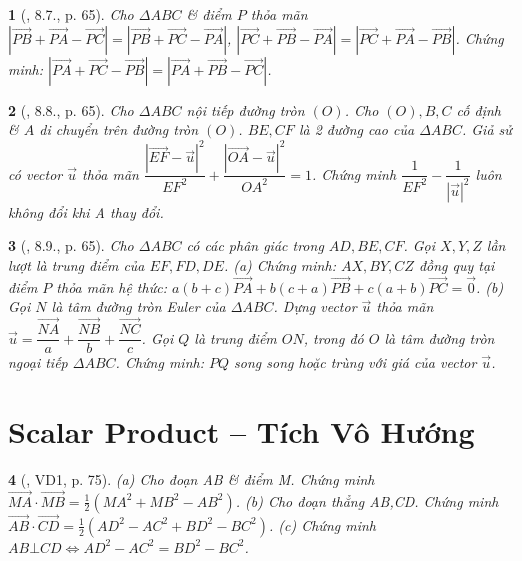\documentclass{article}
\newtheorem{baitoan}{}
\begin{document}
\begin{baitoan}[\cite{Hai_Hung_Thu_Tung2022_tap_1}, 8.7., p. 65]
	Cho $\Delta ABC$ \& điểm $P$ thỏa mãn $|\overrightarrow{PB} + \overrightarrow{PA} - \overrightarrow{PC}| = |\overrightarrow{PB} + \overrightarrow{PC} - \overrightarrow{PA}|$, $|\overrightarrow{PC} + \overrightarrow{PB} - \overrightarrow{PA}| = |\overrightarrow{PC} + \overrightarrow{PA} - \overrightarrow{PB}|$. Chứng minh: $|\overrightarrow{PA} + \overrightarrow{PC} - \overrightarrow{PB}| = |\overrightarrow{PA} + \overrightarrow{PB} - \overrightarrow{PC}|$.
\end{baitoan}

\begin{baitoan}[\cite{Hai_Hung_Thu_Tung2022_tap_1}, 8.8., p. 65]
	Cho $\Delta ABC$ nội tiếp đường tròn $(O)$. Cho $(O),B,C$ cố định \& $A$ di chuyển trên đường tròn $(O)$. $BE,CF$ là 2 đường cao của $\Delta ABC$. Giả sử có vector $\vec{u}$ thỏa mãn $\dfrac{|\overrightarrow{EF} - \vec{u}|^2}{EF^2} + \dfrac{|\overrightarrow{OA} - \vec{u}|^2}{OA^2} = 1$. Chứng minh $\dfrac{1}{EF^2} - \dfrac{1}{|\vec{u}|^2}$ luôn không đổi khi A thay đổi.
\end{baitoan}

\begin{baitoan}[\cite{Hai_Hung_Thu_Tung2022_tap_1}, 8.9., p. 65]
	Cho $\Delta ABC$ có các phân giác trong $AD,BE,CF$. Gọi $X,Y,Z$ lần lượt là trung điểm của $EF,FD,DE$. (a) Chứng minh: $AX,BY,CZ$ đồng quy tại điểm $P$ thỏa mãn hệ thức: $a(b + c)\overrightarrow{PA} + b(c + a)\overrightarrow{PB} + c(a + b)\overrightarrow{PC} = \vec{0}$. (b) Gọi $N$ là tâm đường tròn Euler của $\Delta ABC$. Dựng vector $\vec{u}$ thỏa mãn $\vec{u} = \dfrac{\overrightarrow{NA}}{a} + \dfrac{\overrightarrow{NB}}{b} + \dfrac{\overrightarrow{NC}}{c}$. Gọi $Q$ là trung điểm $ON$, trong đó $O$ là tâm đường tròn ngoại tiếp $\Delta ABC$. Chứng minh: $PQ$ song song hoặc trùng với giá của vector $\vec{u}$.
\end{baitoan}


\section{Scalar Product -- Tích Vô Hướng}

\begin{baitoan}[\cite{Hai_Hung_Thu_Tung2022_tap_1}, VD1, p. 75]
	(a) Cho đoạn AB \& điểm M. Chứng minh $\overrightarrow{MA}\cdot\overrightarrow{MB} = \frac{1}{2}(MA^2 + MB^2 - AB^2)$. (b) Cho đoạn thẳng AB,CD. Chứng minh $\overrightarrow{AB}\cdot\overrightarrow{CD} = \frac{1}{2}(AD^2 - AC^2 + BD^2 - BC^2)$. (c) Chứng minh $AB\bot CD\Leftrightarrow AD^2 - AC^2 = BD^2 - BC^2$.
\end{baitoan}
\end{document}
